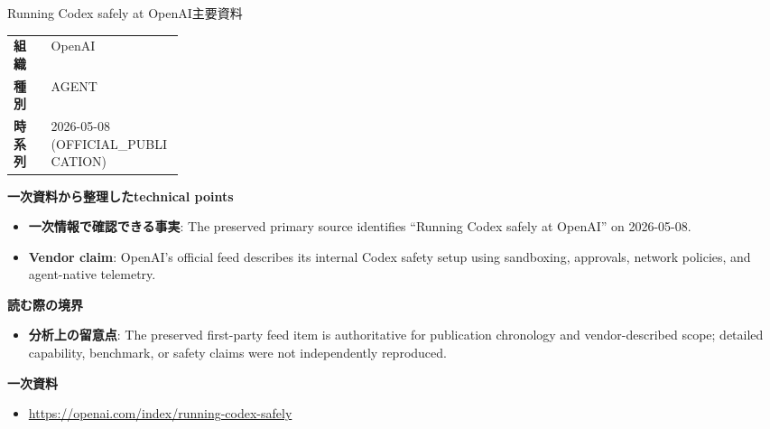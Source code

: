 \begin{technicalnote}{Running Codex safely at OpenAI}{主要資料}
\begin{tabularx}{\linewidth}{@{}>{\bfseries}p{0.22\linewidth}X@{}}
組織 & OpenAI \\
種別 & AGENT \\
時系列 & 2026-05-08 (OFFICIAL\_PUBLICATION) \\
\end{tabularx}
\smallskip
{\bfseries 一次資料から整理したtechnical points}
\begin{itemize}[leftmargin=1.5em,itemsep=0.35em]
\item \textbf{一次情報で確認できる事実}: The preserved primary source identifies “Running Codex safely at OpenAI” on 2026-05-08.
\item \textbf{Vendor claim}: OpenAI's official feed describes its internal Codex safety setup using sandboxing, approvals, network policies, and agent-native telemetry.
\end{itemize}
{\bfseries 読む際の境界}
\begin{itemize}[leftmargin=1.5em,itemsep=0.35em]
\item \textbf{分析上の留意点}: The preserved first-party feed item is authoritative for publication chronology and vendor-described scope; detailed capability, benchmark, or safety claims were not independently reproduced.
\end{itemize}
{\bfseries 一次資料}
\begingroup\sloppy
\begin{itemize}[leftmargin=1.5em,itemsep=0.25em]
\item {\scriptsize\url{https://openai.com/index/running-codex-safely}}
\end{itemize}
\endgroup
\end{technicalnote}
\medskip

